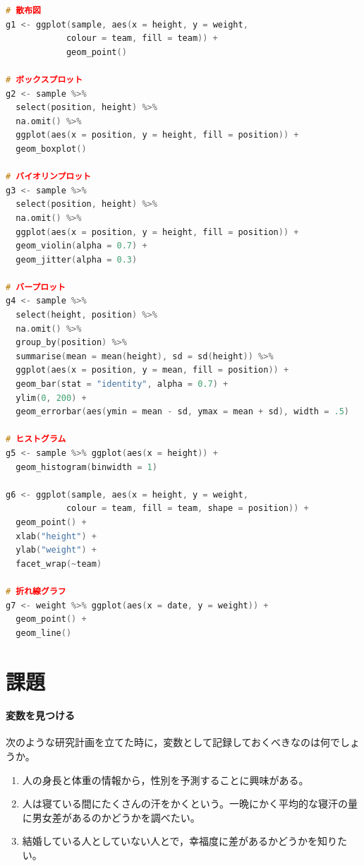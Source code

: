 \documentclass{ltjsbook}
\begin{document}
\begin{lstlisting}[language=c++,label={code:03_01},caption={ggplot2による描画コード}]
# 散布図
g1 <- ggplot(sample, aes(x = height, y = weight, 
			colour = team, fill = team)) +
  			geom_point()

# ボックスプロット
g2 <- sample %>%
  select(position, height) %>%
  na.omit() %>%
  ggplot(aes(x = position, y = height, fill = position)) +
  geom_boxplot()

# バイオリンプロット
g3 <- sample %>%
  select(position, height) %>%
  na.omit() %>%
  ggplot(aes(x = position, y = height, fill = position)) +
  geom_violin(alpha = 0.7) +
  geom_jitter(alpha = 0.3)

# バープロット
g4 <- sample %>%
  select(height, position) %>%
  na.omit() %>%
  group_by(position) %>%
  summarise(mean = mean(height), sd = sd(height)) %>%
  ggplot(aes(x = position, y = mean, fill = position)) +
  geom_bar(stat = "identity", alpha = 0.7) +
  ylim(0, 200) +
  geom_errorbar(aes(ymin = mean - sd, ymax = mean + sd), width = .5)
  
# ヒストグラム
g5 <- sample %>% ggplot(aes(x = height)) +
  geom_histogram(binwidth = 1)

g6 <- ggplot(sample, aes(x = height, y = weight, 
            colour = team, fill = team, shape = position)) +
  geom_point() +
  xlab("height") +
  ylab("weight") +
  facet_wrap(~team)

# 折れ線グラフ
g7 <- weight %>% ggplot(aes(x = date, y = weight)) +
  geom_point() +
  geom_line()
\end{lstlisting}



\section{課題}
\paragraph{変数を見つける}次のような研究計画を立てた時に，変数として記録しておくべきなのは何でしょうか。
\begin{enumerate}
	\item 人の身長と体重の情報から，性別を予測することに興味がある。
	\item 人は寝ている間にたくさんの汗をかくという。一晩にかく平均的な寝汗の量に男女差があるのかどうかを調べたい。
	\item 結婚している人としていない人とで，幸福度に差があるかどうかを知りたい。
\end{enumerate}
\end{document}
